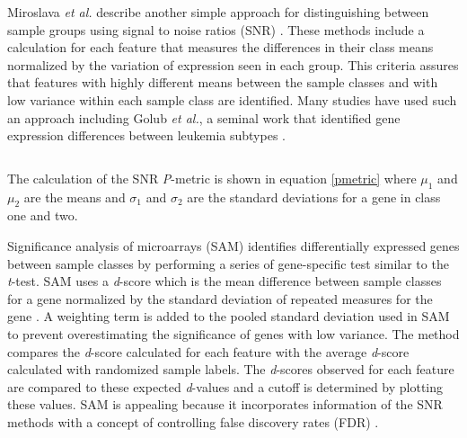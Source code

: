 Miroslava \emph{et al.} describe another simple approach for distinguishing
between sample groups using signal to noise ratios (SNR)
\cite{PMID_164182572,PMID_12933571,yeang2001mcm,PMID_12384549}.  These methods
include a calculation for each feature that measures the differences in their
class means normalized by the variation of expression seen in each group.  This
criteria assures that features with highly different means between the sample
classes and with low variance within each sample class are identified.  Many
studies have used such an approach including Golub \emph{et al.}, a seminal
work that identified gene expression differences between leukemia subtypes
\cite{PMID_164182572,PMID_12933571,yeang2001mcm,PMID_12933571}.

\begin{equation}\label{pmetric}
\end{equation}

The calculation of the SNR \emph{P}-metric is shown in equation \eqref{pmetric}
where $\mu_1$ and $\mu_2$ are the means and $\sigma_1$ and $\sigma_2$ are the
standard deviations for a gene in class one and two.


Significance analysis of microarrays (SAM) identifies differentially expressed
genes between sample classes by performing a series of gene-specific test
similar to the \emph{t}-test.  SAM uses a \emph{d}-score which is the mean
difference between sample classes for a gene normalized by the standard
deviation of repeated measures for the gene \cite{tusher2001sam}.  A weighting
term is added to the pooled standard deviation used in SAM to prevent
overestimating the significance of genes with low variance.  The method
compares the \emph{d}-score calculated for each feature with the average
\emph{d}-score calculated with randomized sample labels.  The \emph{d}-scores
observed for each feature are compared to these expected \emph{d}-values and a
cutoff is determined by plotting these values. SAM is appealing because it
incorporates information of the SNR methods with a concept of controlling false
discovery rates (FDR) \cite{efron2001eba}.

% 
% 

